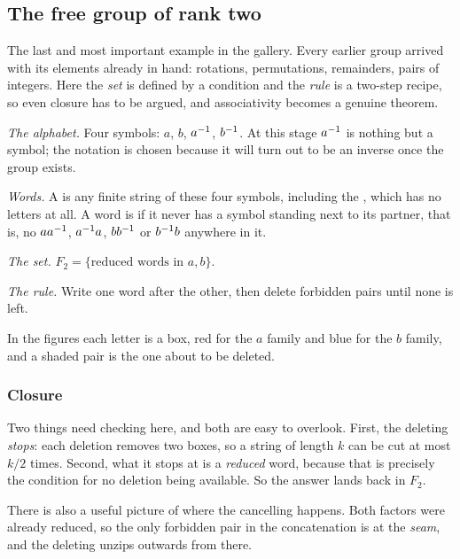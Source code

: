 \subsection{The free group of rank two}\label{sec:free}

The last and most important example in the gallery. Every earlier group arrived with its elements
already in hand: rotations, permutations, remainders, pairs of integers. Here the \emph{set} is
defined by a condition and the \emph{rule} is a two-step recipe, so even closure has to be argued,
and associativity becomes a genuine theorem.

\emph{The alphabet.} Four symbols: $a$, $b$, $a^{-1}$, $b^{-1}$. At this stage $a^{-1}$ is nothing but
a symbol; the notation is chosen because it will turn out to be an inverse once the group exists.

\emph{Words.} A  is any finite string of these four symbols, including the
, which has no letters at all. A word is  if it never has a symbol
standing next to its partner, that is, no $aa^{-1}$, $a^{-1} a$, $bb^{-1}$ or $b^{-1} b$ anywhere in it.

\emph{The set.} $F_2=\{\text{reduced words in }a,b\}$.

\emph{The rule.} Write one word after the other, then delete forbidden pairs until none is left.

In the figures each letter is a box, red for the $a$ family and blue for the $b$ family, and a
shaded pair is the one about to be deleted.


\subsubsection*{Closure}

Two things need checking here, and both are easy to overlook. First, the deleting \emph{stops}:
each deletion removes two boxes, so a string of length $k$ can be cut at most $k/2$ times. Second,
what it stops at is a \emph{reduced} word, because that is precisely the condition for no deletion
being available. So the answer lands back in $F_2$.

There is also a useful picture of where the cancelling happens. Both factors were already reduced,
so the only forbidden pair in the concatenation is at the \emph{seam}, and the deleting unzips
outwards from there.

